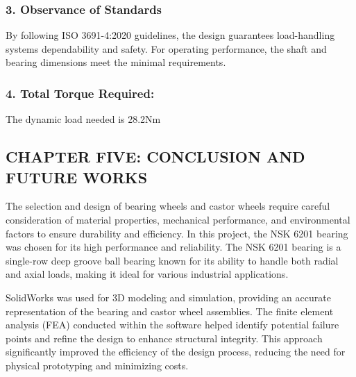 \documentclass[../../main]{subfiles}
\begin{document}
\subsubsection{\texorpdfstring{3. \textbf{Observance of
Standards}}{3. Observance of Standards}}\label{observance-of-standards}

By following ISO 3691-4:2020 guidelines, the design guarantees
load-handling systems\textquotesingle{} dependability and safety. For
operating performance, the shaft and bearing dimensions meet the minimal
requirements.

\subsubsection{\texorpdfstring{4. \textbf{Total Torque
Required}:}{4. Total Torque Required:}}\label{total-torque-required}

The dynamic load needed is 28.2Nm

\subsection{}\label{section-2}

\subsection{}\label{section-3}

\subsection{}\label{section-4}

\subsection{\texorpdfstring{\textbf{CHAPTER FIVE: CONCLUSION AND FUTURE
WORKS}}{CHAPTER FIVE: CONCLUSION AND FUTURE WORKS}}\label{chapter-five-conclusion-and-future-works}

The selection and design of bearing wheels and castor wheels require
careful consideration of material properties, mechanical performance,
and environmental factors to ensure durability and efficiency. In this
project, the NSK 6201 bearing was chosen for its high performance and
reliability. The NSK 6201 bearing is a single-row deep groove ball
bearing known for its ability to handle both radial and axial loads,
making it ideal for various industrial applications.

SolidWorks was used for 3D modeling and simulation, providing an
accurate representation of the bearing and castor wheel assemblies. The
finite element analysis (FEA) conducted within the software helped
identify potential failure points and refine the design to enhance
structural integrity. This approach significantly improved the
efficiency of the design process, reducing the need for physical
prototyping and minimizing costs.
\end{document}
